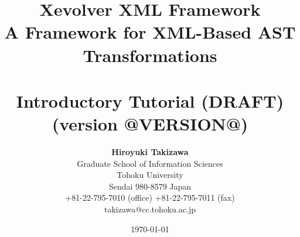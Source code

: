 \documentclass[10pt]{book}
\begin{document}
\title{ {\bf {Xevolver XML Framework}}\\
A Framework for XML-Based AST Transformations \\
~\\
\bf{Introductory Tutorial (DRAFT)} \\
{(version @VERSION@)}}

\author{ {\bf Hiroyuki Takizawa} \\
Graduate School of Information Sciences\\
Tohoku University\\
Sendai 980-8579 Japan\\
+81-22-795-7010 (office)  +81-22-795-7011 (fax) \\
takizawa@cc.tohoku.ac.jp
       }
\date{\today}

\maketitle




\tableofcontents







\appendix

\end{document}
